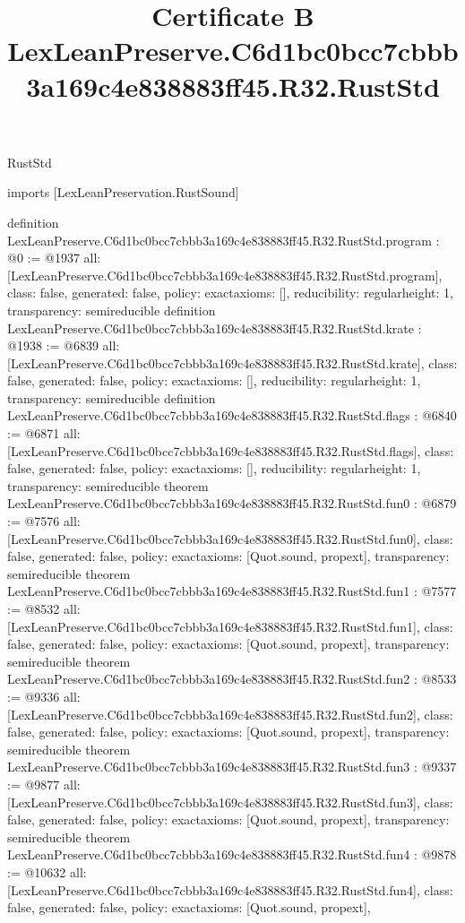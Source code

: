 \begin{lexlean}{RustStd}
\title{Certificate B LexLeanPreserve.C6d1bc0bcc7cbbb3a169c4e838883ff45.R32.RustStd}
\begin{coremodule}
imports [LexLeanPreservation.RustSound]

definition LexLeanPreserve.C6d1bc0bcc7cbbb3a169c4e838883ff45.R32.RustStd.program : @0 := @1937 {
  all: [LexLeanPreserve.C6d1bc0bcc7cbbb3a169c4e838883ff45.R32.RustStd.program],
  class: false,
  generated: false,
  policy: exact{axioms: []},
  reducibility: regular{height: 1},
  transparency: semireducible
}
definition LexLeanPreserve.C6d1bc0bcc7cbbb3a169c4e838883ff45.R32.RustStd.krate : @1938 := @6839 {
  all: [LexLeanPreserve.C6d1bc0bcc7cbbb3a169c4e838883ff45.R32.RustStd.krate],
  class: false,
  generated: false,
  policy: exact{axioms: []},
  reducibility: regular{height: 1},
  transparency: semireducible
}
definition LexLeanPreserve.C6d1bc0bcc7cbbb3a169c4e838883ff45.R32.RustStd.flags : @6840 := @6871 {
  all: [LexLeanPreserve.C6d1bc0bcc7cbbb3a169c4e838883ff45.R32.RustStd.flags],
  class: false,
  generated: false,
  policy: exact{axioms: []},
  reducibility: regular{height: 1},
  transparency: semireducible
}
theorem LexLeanPreserve.C6d1bc0bcc7cbbb3a169c4e838883ff45.R32.RustStd.fun0 : @6879 := @7576 {
  all: [LexLeanPreserve.C6d1bc0bcc7cbbb3a169c4e838883ff45.R32.RustStd.fun0],
  class: false,
  generated: false,
  policy: exact{axioms: [Quot.sound, propext]},
  transparency: semireducible
}
theorem LexLeanPreserve.C6d1bc0bcc7cbbb3a169c4e838883ff45.R32.RustStd.fun1 : @7577 := @8532 {
  all: [LexLeanPreserve.C6d1bc0bcc7cbbb3a169c4e838883ff45.R32.RustStd.fun1],
  class: false,
  generated: false,
  policy: exact{axioms: [Quot.sound, propext]},
  transparency: semireducible
}
theorem LexLeanPreserve.C6d1bc0bcc7cbbb3a169c4e838883ff45.R32.RustStd.fun2 : @8533 := @9336 {
  all: [LexLeanPreserve.C6d1bc0bcc7cbbb3a169c4e838883ff45.R32.RustStd.fun2],
  class: false,
  generated: false,
  policy: exact{axioms: [Quot.sound, propext]},
  transparency: semireducible
}
theorem LexLeanPreserve.C6d1bc0bcc7cbbb3a169c4e838883ff45.R32.RustStd.fun3 : @9337 := @9877 {
  all: [LexLeanPreserve.C6d1bc0bcc7cbbb3a169c4e838883ff45.R32.RustStd.fun3],
  class: false,
  generated: false,
  policy: exact{axioms: [Quot.sound, propext]},
  transparency: semireducible
}
theorem LexLeanPreserve.C6d1bc0bcc7cbbb3a169c4e838883ff45.R32.RustStd.fun4 : @9878 := @10632 {
  all: [LexLeanPreserve.C6d1bc0bcc7cbbb3a169c4e838883ff45.R32.RustStd.fun4],
  class: false,
  generated: false,
  policy: exact{axioms: [Quot.sound, propext]},
}
\end{coremodule}
\end{lexlean}
